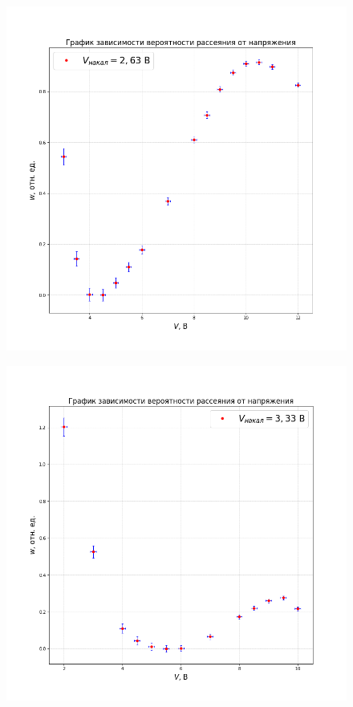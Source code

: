 \documentclass[a4paper,12pt]{article}
\begin{document}
\begin{figure}[H]\label{fig: w(V) first V}
    \centering
    \includegraphics[width = \textwidth]{w(V)first.png}
\end{figure}

\begin{figure}[H]\label{fig: w(V) second V}
    \centering
    \includegraphics[width = \textwidth]{w(V)second.png}
\end{figure}

\end{document}
